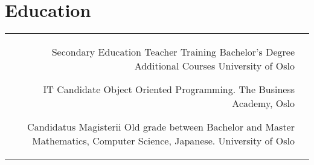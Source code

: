 \documentclass[10pt]{article} %
\begin{document}
\begin{paracol}{2}
\begin{supertabular}{rl}
\end{supertabular}





\section{Education} 





\begin{supertabular}{rl} %

	
	{Secondary Education Teacher Training} %
	{Bachelor's Degree Additional Courses} %
	{} %
	{University of Oslo} %
	
	{IT Candidate} %
	{} %
	{Object Oriented Programming.} %
	{The Business Academy, Oslo} %
	
	{Candidatus Magisterii} %
	{Old grade between Bachelor and Master} %
	{Mathematics, Computer Science, Japanese.} %
	{University of Oslo} %



\end{supertabular}




\end{paracol}
\end{document}
